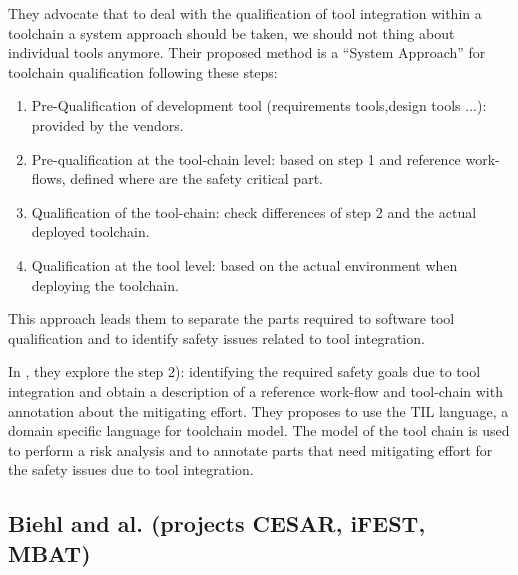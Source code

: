 \documentclass{openetcs_report}
\begin{document}
They advocate that to deal with the qualification of tool integration
within a toolchain a system approach should be taken, we should not
thing about individual tools anymore.  Their proposed method is a ``System
Approach'' for toolchain qualification following these steps:

\begin{enumerate}
\item Pre-Qualification of development tool (requirements tools,design
  tools ...): provided by the vendors.
\item Pre-qualification at the tool-chain level: based on step 1 and
  reference work-flows, defined where are the safety critical part.
\item Qualification of the tool-chain: check differences of step 2 and
  the actual deployed toolchain.
\item Qualification at the tool level: based on the actual environment
  when deploying the toolchain.
\end{enumerate}
This approach leads them to separate the parts required to software tool
qualification and to identify safety issues related to tool integration.

In \cite{asplund_towards_2012}, they explore the step 2): identifying
the required safety goals due to tool integration and obtain a
description of a reference work-flow and tool-chain with annotation
about the mitigating effort.  They proposes to use the TIL language, a
domain specific language for toolchain model.  The model of the tool
chain is used to perform a risk analysis and to annotate parts
that need mitigating effort for the safety issues due to tool
integration. 

\subsection{Biehl and al. (projects CESAR, iFEST, MBAT)}
\label{sec-1-2.3}
\end{document}
